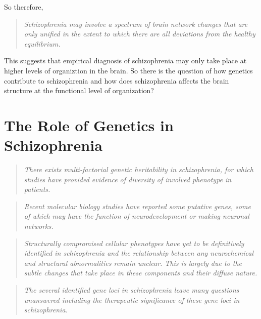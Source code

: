 So therefore,
\begin{quotation}
	\textit{Schizophrenia may involve a spectrum of brain network changes that are only unified in the extent to which there are all deviations from the healthy equilibrium.}
	\begin{flushright}
		\cite{bakhshi2015neuropathology}
	\end{flushright}
\end{quotation}
This suggests that empirical diagnosis of schizophrenia may only take place at higher levels of organiztion in the brain. So there is the question of how genetics contribute to schizophrenia and how does schizophrenia affects the brain structure at the functional level of organization?

\section{The Role of Genetics in Schizophrenia}\label{sec:geneticsSZ}
\begin{quotation}
	\textit{There exists multi-factorial genetic heritability in schizophrenia, for which studies have provided evidence of diversity of involved phenotype in patients.}
	\begin{flushright}
		\cite{bakhshi2015neuropathology}
	\end{flushright}
\end{quotation}
\begin{quotation}
	\textit{Recent molecular biology studies have reported some putative genes, some of which may have the function of neurodevelopment or making neuronal networks.}
	\begin{flushright}
		\cite{iritani2007neuropathology}
	\end{flushright}
\end{quotation}
\begin{quotation}
	\textit{Structurally compromised cellular phenotypes have yet to be definitively identified in schizophrenia and the relationship between any neurochemical and structural abnormalities remain unclear. This is largely due to the subtle changes that take place in these components and their diffuse nature.}
	\begin{flushright}
		\cite{halliday2001proceedings}
	\end{flushright}
\end{quotation}
\begin{quotation}
	\textit{The several identified gene loci in schizophrenia leave many questions unanswered including the therapeutic significance of these gene loci in schizophrenia.}
	\begin{flushright}
		\cite{harrison2015recent}
	\end{flushright}
\end{quotation}
